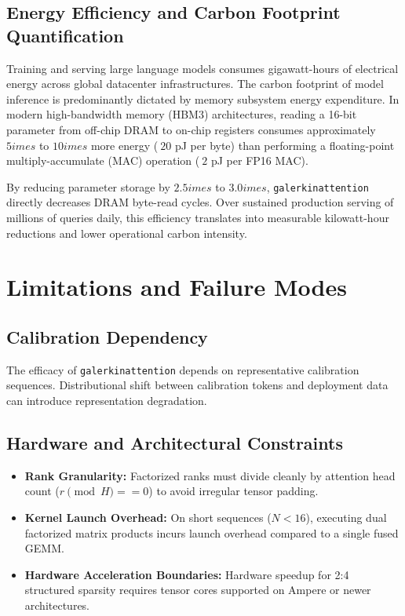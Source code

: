 \subsection{Energy Efficiency and Carbon Footprint Quantification}
Training and serving large language models consumes gigawatt-hours of electrical energy across global datacenter infrastructures. The carbon footprint of model inference is predominantly dictated by memory subsystem energy expenditure. In modern high-bandwidth memory (HBM3) architectures, reading a 16-bit parameter from off-chip DRAM to on-chip registers consumes approximately $5	imes$ to $10	imes$ more energy ($~20$ pJ per byte) than performing a floating-point multiply-accumulate (MAC) operation ($~2$ pJ per FP16 MAC).

By reducing parameter storage by $2.5	imes$ to $3.0	imes$, \texttt{galerkinattention} directly decreases DRAM byte-read cycles. Over sustained production serving of millions of queries daily, this efficiency translates into measurable kilowatt-hour reductions and lower operational carbon intensity.


\section{Limitations and Failure Modes}

\subsection{Calibration Dependency}
The efficacy of \texttt{galerkinattention} depends on representative calibration sequences. Distributional shift between calibration tokens and deployment data can introduce representation degradation.

\subsection{Hardware and Architectural Constraints}
\begin{itemize}
\item \textbf{Rank Granularity:} Factorized ranks must divide cleanly by attention head count ($r \pmod H == 0$) to avoid irregular tensor padding.
\item \textbf{Kernel Launch Overhead:} On short sequences ($N < 16$), executing dual factorized matrix products incurs launch overhead compared to a single fused GEMM.
\item \textbf{Hardware Acceleration Boundaries:} Hardware speedup for 2:4 structured sparsity requires tensor cores supported on Ampere or newer architectures.
\end{itemize}

